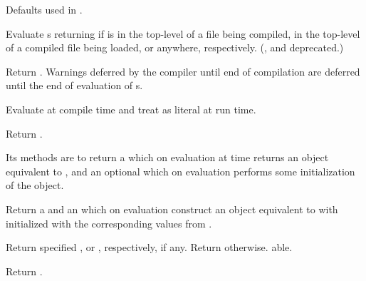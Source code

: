 \begin{LIST}{1cm}
  {
  Defaults used in .
  }

  {
  Evaluate s returning  if
   is in the top-level of a file being compiled, in the
  top-level of a compiled file being loaded, or anywhere,
  respectively. (,  and  deprecated.)
  }

  {
  Return . Warnings deferred by the
  compiler until end of compilation are deferred until the end of
  evaluation of s. 
  }

  {
  Evaluate  at compile time and treat  as
  literal at run time. 
  }

  {
  Return .
  }

  {
  Its methods are to return a  which on
  evaluation at  time returns an object equivalent to
  , and an optional  which on
  evaluation performs some initialization of the object. 
  }

  {
  Return a  and an  which on evaluation construct an object equivalent to
   with  initialized with the corresponding values
  from . 
  }

  {
  Return specified , or , respectively, if any. Return \retval{\NIL}
  otherwise. able. 
  }
  
  {
  Return .
  }

\end{LIST}


